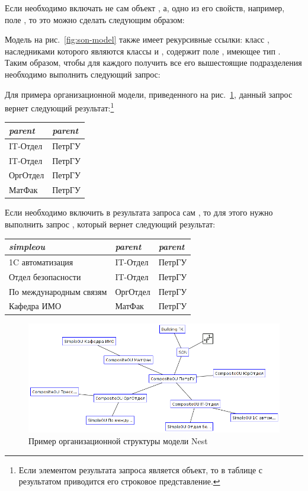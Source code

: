Если необходимо включать не сам объект , а, 
одно из его свойств, например, поле , то это можно сделать следующим образом:

Модель на рис.~\ref{fig:son-model} также имеет рекурсивные ссылки: 
класс , наследниками которого являются классы  и ,
содержит поле , имеющее тип . Таким образом, чтобы для каждого 
 получить все его вышестоящие подразделения необходимо выполнить следующий запрос:

Для примера организационной модели, приведенного на рис.~\ref{fig:model-snapshot-org}, 
данный запрос вернет следующий результат:\footnote{Если элементом результата запроса 
является объект, то в таблице с результатом приводится его строковое представление.}


\begin{center}
    \begin{tabular}{|l|l|}
	\hline
	\it{parent} & \it{parent}\\[5pt]
	\hline
	\hline
	IT-Отдел & ПетрГУ \\
	\hline
	IT-Отдел & ПетрГУ \\
	\hline
	ОргОтдел & ПетрГУ \\
	\hline
	МатФак & ПетрГУ \\
	\hline
    \end{tabular}
\end{center}

Если необходимо включить в результата запроса сам , то для этого нужно
выполнить запрос
,
который вернет следующий результат:
\begin{center}
    \begin{tabular}{|l|l|l|}
	\hline
	\it{simpleou} & \it{parent} & \it{parent}\\[5pt]
	\hline
	\hline
	1C автоматизация & IT-Отдел & ПетрГУ \\
	\hline
	Отдел безопасности & IT-Отдел & ПетрГУ \\
	\hline
	По международным связям & ОргОтдел & ПетрГУ \\
	\hline
	Кафедра ИМО & МатФак & ПетрГУ \\
	\hline
    \end{tabular}
\end{center}


\begin{figure}[hbt]
  \centering
  \includegraphics[scale=0.5]{figures/model_snapshot_org_petrsu}
  \caption{Пример организационной структуры модели Nest}
  \label{fig:model-snapshot-org}
\end{figure}


